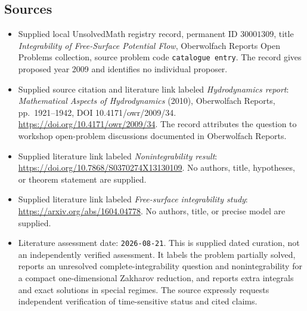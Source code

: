 \documentclass[11pt]{article}
\begin{document}
\subsection{Sources}
\begin{itemize}
\item Supplied local UnsolvedMath registry record, permanent ID \(30001309\), title \emph{Integrability of Free-Surface Potential Flow}, Oberwolfach Reports Open Problems collection, source problem code \texttt{catalogue entry}. The record gives proposed year 2009 and identifies no individual proposer.
\item Supplied source citation and literature link labeled \emph{Hydrodynamics report}: \emph{Mathematical Aspects of Hydrodynamics} (2010), Oberwolfach Reports, pp.\ 1921--1942, DOI 10.4171/owr/2009/34. \url{https://doi.org/10.4171/owr/2009/34}. The record attributes the question to workshop open-problem discussions documented in Oberwolfach Reports.
\item Supplied literature link labeled \emph{Nonintegrability result}: \url{https://doi.org/10.7868/S0370274X13130109}. No authors, title, hypotheses, or theorem statement are supplied.
\item Supplied literature link labeled \emph{Free-surface integrability study}: \url{https://arxiv.org/abs/1604.04778}. No authors, title, or precise model are supplied.
\item Literature assessment date: \texttt{2026-08-21}. This is supplied dated curation, not an independently verified assessment. It labels the problem partially solved, reports an unresolved complete-integrability question and nonintegrability for a compact one-dimensional Zakharov reduction, and reports extra integrals and exact solutions in special regimes. The source expressly requests independent verification of time-sensitive status and cited claims.
\end{itemize}
\end{document}
